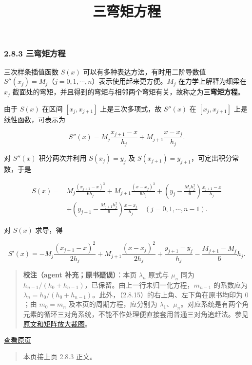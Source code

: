\documentclass[
  10pt,
  fontset=fandol]{ctexart}
\title{三弯矩方程}
\author{}
\date{}
\begin{document}
\maketitle

\subsubsection{2.8.3 三弯矩方程}\label{ux4e09ux5f2fux77e9ux65b9ux7a0b}

三次样条插值函数 \(S(x)\) 可以有多种表达方法，有时用二阶导数值 \(S''(x_j)=M_j\)（\(j=0,1,\cdots,n\)）表示使用起来更方便。\(M_j\) 在力学上解释为细梁在 \(x_j\) 截面处的弯矩，并且得到的弯矩与相邻两个弯矩有关，故称之为\textbf{三弯矩方程}。

由于 \(S(x)\) 在区间 \([x_j,x_{j+1}]\) 上是三次多项式，故 \(S''(x)\) 在 \([x_j,x_{j+1}]\) 上是线性函数，可表示为

\[S''(x)=M_j\frac{x_{j+1}-x}{h_j}+M_{j+1}\frac{x-x_j}{h_j}.\tag{2.8.16}\]

对 \(S''(x)\) 积分两次并利用 \(S(x_j)=y_j\) 及 \(S(x_{j+1})=y_{j+1}\)，可定出积分常数，于是

\[\begin{aligned}
S(x)={}&M_j\frac{(x_{j+1}-x)^3}{6h_j}+M_{j+1}\frac{(x-x_j)^3}{6h_j}+\left(y_j-\frac{M_jh_j^2}6\right)\frac{x_{j+1}-x}{h_j}\\
&+\left(y_{j+1}-\frac{M_{j+1}h_j^2}6\right)\frac{x-x_j}{h_j}\quad(j=0,1,\cdots,n-1).
\end{aligned}\tag{2.8.17}\]

对 \(S(x)\) 求导，得

\[S'(x)=-M_j\frac{(x_{j+1}-x)^2}{2h_j}+M_{j+1}\frac{(x-x_j)^2}{2h_j}+\frac{y_{j+1}-y_j}{h_j}-\frac{M_{j+1}-M_j}6h_j.\tag{2.8.18}\]

\begin{quote}
\textbf{校注（agent 补充；原书疑误）}：本页 \(\lambda_n\) 原式与 \(\mu_n\) 同为 \(h_{n-1}/(h_0+h_{n-1})\)，已保留。由上一行未归一化方程，\(m_{n-1}\) 的系数应为 \(\lambda_n=h_0/(h_0+h_{n-1})\)。此外，（2.8.15）的右上角、左下角在原书均印为 \(0\)；由 \(m_0=m_n\) 及本页的周期方程，应分别为 \(\lambda_1\)、\(\mu_n\)。对应系统是有两个角元素的循环三对角系统，不能不作处理便直接套用普通三对角追赶法。参见\href{../assets/ch02b/pdf-052-periodic-system-detail.png}{原文和矩阵放大裁图}。
\end{quote}

\href{../../source-images/pdf-053.jpeg}{查看原页}

\begin{quote}
本页接上页 2.8.3 正文。
\end{quote}
\end{document}
